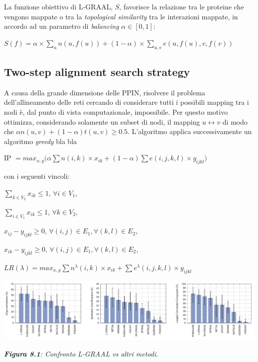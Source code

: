 \documentclass[11pt]{article}
\begin{document}
La funzione obiettivo di L-GRAAL, $S$, favorisce la relazione tra le proteine che vengono mappate o tra la \textit{topological similarity} tra le interazioni mappate, in accordo ad un parametro di \textit{balancing} $\alpha \in [0,1]$:
\begin{center}
$S(f) = \alpha \times \displaystyle{\sum_{u}n(u,f(u)) + (1- \alpha) \times \sum_{u,v}e(u,f(u),v,f(v))}$
\end{center}

\subsection{Two-step alignment search strategy}
A causa della grande dimensione delle PPIN, risolvere il problema dell'allineamento delle reti cercando di considerare tutti i possibili mapping tra i nodi è, dal punto di vista computazionale, impossibile. Per questo motivo ottimizza, considerando solamente un subset di nodi, il mapping $u \longleftrightarrow v$ di modo che $\alpha n(u,v) + (1-\alpha)t(u,v) \geq 0.5$. L'algoritmo applica successivamente un algoritmo \textit{greedy} bla bla

\begin{center}
IP $= max_{x,y} \displaystyle{(\alpha \sum n(i,k) \times x_{ik} + (1- \alpha) \sum e(i,j,k,l) \times y_{ijkl}})$
\end{center}
con i seguenti vincoli:
\begin{center}
$\displaystyle{\sum_{k \in V_2}x_{ik} \leq 1}$, $\forall i \in V_1$,

$\displaystyle{\sum_{i \in V_1}x_{ik} \leq 1}$, $\forall k \in V_2$,

$x_{ij} - y_{ijkl} \geq 0$, $\forall (i,j) \in E_1, \forall (k,l) \in E_2$,

$x_{ik} - y_{ijkl} \geq 0$, $\forall (i,j) \in E_1, \forall (k,l) \in E_2$,
\end{center}

\begin{center}
$LR(\lambda) = max_{x,y} \displaystyle{\sum n^{\lambda}(i,k) \times x_{ik} + \sum e^{\lambda}(i,j,k,l) \times y_{ijkl}}$
\end{center}

\begin{center}
\includegraphics[scale=0.33]{graal2}

\begin{small}\textit{\textbf{Figura 8.1}: Confronto L-GRAAL vs altri metodi}.\end{small}
\end{center}
\end{document}
